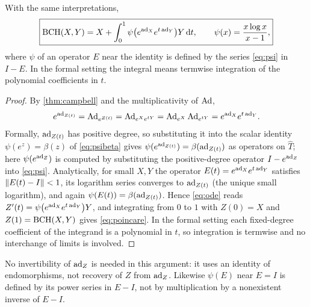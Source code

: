 \begin{theorem}\label{thm:poincare}
With the same interpretations,
\begin{equation}\label{eq:poincare}
 \boxed{\displaystyle
 \operatorname{BCH}(X,Y)=X+\int_0^1\psi\bigl(e^{\operatorname{ad}_X}e^{t\operatorname{ad}_Y}\bigr)Y\,\mathrm{d} t,\qquad
 \psi(x)=\frac{x\log x}{x-1},}
\end{equation}
where $\psi$ of an operator $E$ near the identity is defined by the series
\eqref{eq:psi} in $I-E$. In the formal setting the integral means
termwise integration of the polynomial coefficients in $t$.
\end{theorem}
\begin{proof}
By \cref{thm:campbell} and the multiplicativity of $\operatorname{Ad}$,
\[
 e^{\operatorname{ad}_{Z(t)}}=\operatorname{Ad}_{e^{Z(t)}}=\operatorname{Ad}_{e^Xe^{tY}}
 =\operatorname{Ad}_{e^X}\operatorname{Ad}_{e^{tY}}=e^{\operatorname{ad}_X}e^{t\operatorname{ad}_Y}.
\]
Formally, $\operatorname{ad}_{Z(t)}$ has positive degree, so substituting it into the
scalar identity $\psi(e^z)=\beta(z)$ of \eqref{eq:psibeta} gives
$\psi(e^{\operatorname{ad}_{Z(t)}})=\beta(\operatorname{ad}_{Z(t)})$ as operators on $\widehat T$; here
$\psi(e^{\operatorname{ad}_Z})$ is computed by substituting the positive-degree operator
$I-e^{\operatorname{ad}_Z}$ into \eqref{eq:psi}. Analytically, for small $X,Y$ the
operator $E(t)=e^{\operatorname{ad}_X}e^{t\operatorname{ad}_Y}$ satisfies $\left\lVert E(t)-I\right\rVert<1$, its
logarithm series converges to $\operatorname{ad}_{Z(t)}$ (the unique small logarithm),
and again $\psi(E(t))=\beta(\operatorname{ad}_{Z(t)})$. Hence \eqref{eq:ode} reads
$Z'(t)=\psi\bigl(e^{\operatorname{ad}_X}e^{t\operatorname{ad}_Y}\bigr)Y$, and integrating from $0$ to
$1$ with $Z(0)=X$ and $Z(1)=\operatorname{BCH}(X,Y)$ gives \eqref{eq:poincare}. In the
formal setting each fixed-degree coefficient of the integrand is a
polynomial in $t$, so integration is termwise and no interchange of limits
is involved.
\end{proof}
No invertibility of $\operatorname{ad}_Z$ is needed in this argument: it uses an identity
of endomorphisms, not recovery of $Z$ from $\operatorname{ad}_Z$. Likewise $\psi(E)$ near
$E=I$ is defined by its power series in $E-I$, not by multiplication by a
nonexistent inverse of $E-I$.

